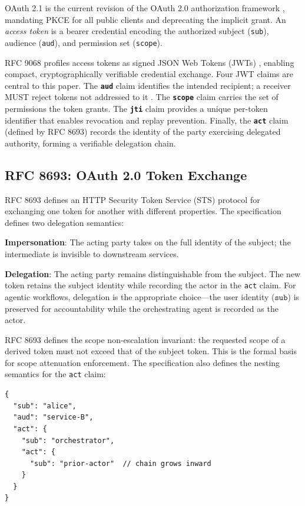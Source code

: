 \documentclass[journal]{IEEEtran}
\begin{document}
OAuth 2.1 \cite{oauth21} is the current revision of the OAuth 2.0 authorization
framework \cite{rfc6749}, mandating PKCE for all public clients and deprecating
the implicit grant. An \textit{access token} is a bearer credential encoding the
authorized subject (\texttt{sub}), audience (\texttt{aud}), and permission set
(\texttt{scope}).

RFC 9068 \cite{rfc9068} profiles access tokens as signed JSON Web Tokens
(JWTs) \cite{rfc7519}, enabling compact, cryptographically verifiable
credential exchange. Four JWT claims are central to this paper.
The \textbf{\texttt{aud}} claim identifies the intended recipient; a receiver
MUST reject tokens not addressed to it \cite{rfc9068}.
The \textbf{\texttt{scope}} claim carries the set of permissions the token grants.
The \textbf{\texttt{jti}} claim provides a unique per-token identifier that
enables revocation and replay prevention.
Finally, the \textbf{\texttt{act}} claim (defined by RFC 8693) records the
identity of the party exercising delegated authority, forming a verifiable
delegation chain.

\subsection{RFC 8693: OAuth 2.0 Token Exchange}

RFC 8693 \cite{rfc8693} defines an HTTP Security Token Service (STS) protocol
for exchanging one token for another with different properties. The specification
defines two delegation semantics:

\textbf{Impersonation}: The acting party takes on the full identity of the
subject; the intermediate is invisible to downstream services.

\textbf{Delegation}: The acting party remains distinguishable from the subject.
The new token retains the subject identity while recording the actor in the
\texttt{act} claim. For agentic workflows, delegation is the appropriate
choice---the user identity ($\texttt{sub}$) is preserved for accountability while
the orchestrating agent is recorded as the actor.

RFC 8693 defines the scope non-escalation invariant: the requested scope of a
derived token must not exceed that of the subject token. This is the formal
basis for scope attenuation enforcement. The specification also defines the
nesting semantics for the \texttt{act} claim:

\begin{lstlisting}[language={},caption={Nested act claim per RFC 8693 \S 4.1},
                   label={lst:actchain}]
{
  "sub": "alice",
  "aud": "service-B",
  "act": {
    "sub": "orchestrator",
    "act": {
      "sub": "prior-actor"  // chain grows inward
    }
  }
}
\end{lstlisting}
\end{document}
